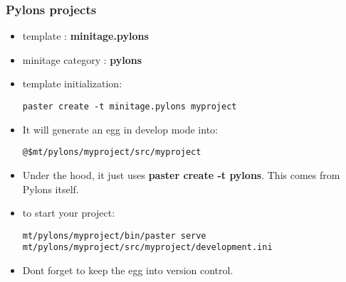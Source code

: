 \documentclass[letterpaper,10pt,english]{sphinxmanual}
\begin{document}
\subsubsection{Pylons projects}
\label{paster/projects/model_projects:minitagepylons}\label{paster/projects/model_projects:pylons-projects}\begin{itemize}
\item {} 
template : \textbf{minitage.pylons}

\item {} 
minitage category : \textbf{pylons}

\item {} 
template initialization:

\begin{Verbatim}[commandchars=@\[\]]
paster create -t minitage.pylons myproject
\end{Verbatim}

\item {} 
It will generate an egg in develop mode into:

\begin{Verbatim}[commandchars=@\[\]]
@$mt/pylons/myproject/src/myproject
\end{Verbatim}

\item {} 
Under the hood, it just uses \textbf{paster create -t pylons}. This comes from
Pylons itself.

\item {} 
to start your project:

\begin{Verbatim}[commandchars=@\[\]]
mt/pylons/myproject/bin/paster serve mt/pylons/myproject/src/myproject/development.ini
\end{Verbatim}

\item {} 
Dont forget to keep the egg into version control.

\end{itemize}
\end{document}
